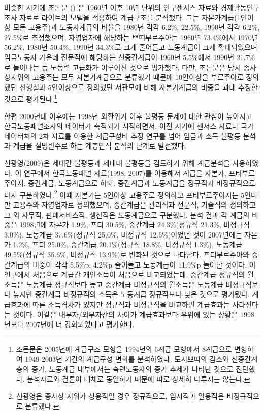 \documentclass[
  letterpaper,
  DIV=11,
  numbers=noendperiod]{scrartcl}
\begin{document}
비슷한 시기에 조돈문 () 은 1960년 이후
10년 단위의 인구센서스 자료와 경제활동인구조사 자료로 라이트의 모델을
적용하여 계급구조를 분석했다. 그는 자본가계급(1인이상 모든 고용주)과
노동자계급의 비율을 1980년 각각 6.2\%, 22.5\%, 1990년 각각 6.2\%,
27.5\%로 추정했으며, 자영업자에 해당하는 쁘띠부르주아는 1960년
73.4\%에서 1970년 56.2\%, 1980년 50.4\%, 1990년 34.3\%로 크게 줄어들고
노동계급이 크게 확대되었으며 임금노동자 가운데 전문직에 해당하는
신중간계급이 1960년 5.5\%에서 1990년 21.7\%로 늘어나는 등 노동력
고급화가 이루어진 것으로 평가했다. 다만, 조돈문은 당시 종사상지위의
고용주는 모두 자본가계급으로 분류했기 때문에 10인이상을 부르주아로
정의했던 신행철과 5인이상으로 정의했던 서관모에 비해 자본가계급의 비중을
과대 추정한 것으로 평가된다.\footnote{조돈문은 2005년에 계급구조 모형을
  1994년의 6계급 모형에서 8계급으로 변형하여 1949-2003년 기간의 계급구성
  변화를 분석하였다. 도시쁘띠의 감소와 신중간계층의 증가, 노동계급
  내부에서는 숙련노동자의 증가 추세가 나타난 것으로 진단했다. 분석자료와
  결론이 대체로 동일하기 때문에 따로 상세히 다루지는 않는다.}

한편 2000년대 이후에는 1998년 외환위기 이후 불평등 문제에 대한 관심이
높아지고 한국노동패널조사의 데이터가 축적되기 시작하면서, 이전 시기에
센서스 자료나 국가데이터처의 2차 자료를 이용한 계급구성비 추정 연구를
넘어 임금과 소득 불평등 분석과 계급을 설명변수로 하는 계층인식 분석의
단계로 발전했다.

신광영(2009)은 세대간 불평등과 세대내 불평등을 검토하기 위해 계급분석을
사용하였다. 이 연구에서 한국노동패널 자료(1998, 2007)를 이용해서 계급을
자본가, 프티부르주아지, 중간계급, 노동계급으로 하되, 중간계급과
노동계급을 정규직과 비정규직으로 다시 구분하였다.\footnote{신광영은
  종사상 지위가 상용직일 경우 정규직으로, 임시직과 일용직은 비정규직으로
  분류했다.} 이때 자본가는 5인이상 고용주로 정의하고 프티부르주아지는
5인미만 고용주와 자영업자로 정의했으며, 중간계급은 관리직과 전문직,
기술직의 정의하고 그 외 사무직, 판매서비스직, 생산직은 노동계급으로
구분했다. 분석 결과 각 계급의 비중은 1998년에 자본가 1.9\%, 프티 30.5\%,
중간계급 24,3\%(정규직 21.3\%, 비정규직 3.0\%), 노동계급 37.6\%(정규직
25.0\%, 비정규직 12.6\%)이었던 것이 2007년에는 자본가 1.2\%, 프티
25.0\%, 중간계급 20.1\%(정규직 18.8\%, 비정규직 1.3\%), 노동계급
49.5\%(정규직 35.6\%, 비정규직 13.9\%)로 변화된 것으로 나타난다.
프티부르주아와 중간계급의 비중이 각각 5.5\%p, 4.2\%p 줄어들고 노동계급이
11.9\%p 늘어난 것이다. 이 연구에서 처음으로 계급간 개인소득이 처음으로
비교되었는데, 중간계급 정규직의 월소득은 노동계급 정규직보다 높고
중간계급 비정규직의 월소득은 노동계급 비정규직보다 높지만 중간계급
비정규직의 소득은 노동계급 정규직보다 낮은 것으로 평가됐다. 계급효과에
따른 소득격차가 있지만 정규직과 비정규직을 비교하면 계급효과는
사라진다는 것이다. 이같은 내부자/외부자간의 차이가 계급효과보다 우위에
있는 상황은 1998년보다 2007년에 더 강화되었다고 평가한다.
\end{document}
